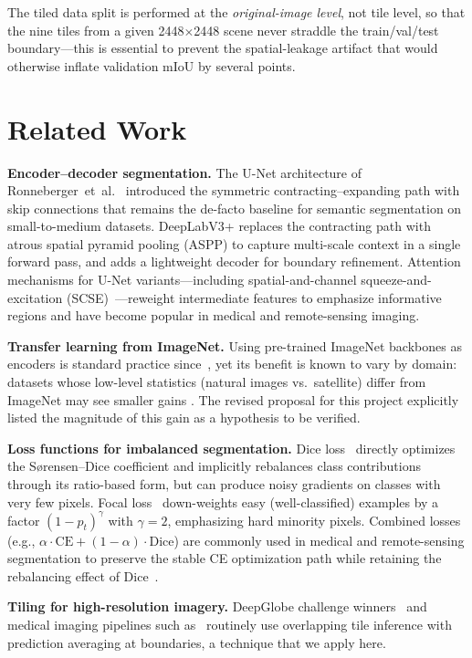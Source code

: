 \documentclass[conference,letterpaper,10pt]{IEEEtran}
\begin{document}
The tiled data split is performed at the \emph{original-image level}, not
tile level, so that the nine tiles from a given 2448$\times$2448 scene never
straddle the train/val/test boundary---this is essential to prevent the
spatial-leakage artifact that would otherwise inflate validation mIoU by
several points.

\section{Related Work}\label{sec:related}

\textbf{Encoder--decoder segmentation.}  The U-Net architecture of
Ronneberger~et~al.~\cite{ronneberger2015unet} introduced the symmetric
contracting--expanding path with skip connections that remains the de-facto
baseline for semantic segmentation on small-to-medium datasets. DeepLabV3+
\cite{chen2018deeplabv3plus} replaces the contracting path with atrous spatial
pyramid pooling (ASPP) to capture multi-scale context in a single forward
pass, and adds a lightweight decoder for boundary refinement. Attention
mechanisms for U-Net variants---including spatial-and-channel
squeeze-and-excitation (SCSE)~\cite{roy2018scse}---reweight intermediate
features to emphasize informative regions and have become popular in
medical and remote-sensing imaging.

\textbf{Transfer learning from ImageNet.}  Using pre-trained ImageNet
backbones as encoders is standard practice since~\cite{he2016resnet}, yet
its benefit is known to vary by domain: datasets whose low-level statistics
(natural images vs.~satellite) differ from ImageNet may see smaller gains
\cite{huh2016makes}. The revised proposal for this project explicitly
listed the magnitude of this gain as a hypothesis to be verified.

\textbf{Loss functions for imbalanced segmentation.}  Dice
loss~\cite{milletari2016vnet} directly optimizes the S\o{}rensen--Dice
coefficient and implicitly rebalances class contributions through its
ratio-based form, but can produce noisy gradients on classes with very few
pixels. Focal loss~\cite{lin2017focal} down-weights easy (well-classified)
examples by a factor $(1-p_t)^\gamma$ with $\gamma=2$, emphasizing hard
minority pixels. Combined losses (e.g., $\alpha\cdot\text{CE}+(1-\alpha)\cdot\text{Dice}$)
are commonly used in medical and remote-sensing segmentation to preserve the
stable CE optimization path while retaining the rebalancing effect of
Dice~\cite{jadon2020survey}.

\textbf{Tiling for high-resolution imagery.}  DeepGlobe challenge
winners~\cite{kuo2018deepglobewinner} and medical imaging pipelines such
as~\cite{roerdink2001watershed,huang2021transunet} routinely use overlapping
tile inference with prediction averaging at boundaries, a technique that
we apply here.
\end{document}
